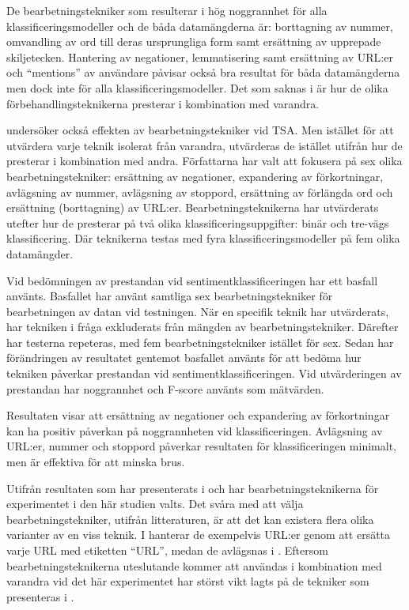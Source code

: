 \documentclass{kaumasters} %
\begin{document}
De bearbetningstekniker som resulterar i hög noggrannhet för alla klassificeringsmodeller och de båda datamängderna är: borttagning av nummer, omvandling av ord till deras ursprungliga form samt ersättning av upprepade skiljetecken. Hantering av negationer, lemmatisering samt ersättning av URL:er och “mentions” av användare påvisar också bra resultat för båda datamängderna men dock inte för alla klassificeringsmodeller. Det som saknas i \cite{effrosynidis2017comparison} är hur de olika förbehandlingsteknikerna presterar i kombination med varandra. 

\cite{7862202} undersöker också effekten av bearbetningstekniker vid TSA. Men istället för att utvärdera varje teknik isolerat från varandra, utvärderas de istället utifrån hur de presterar i kombination med andra. Författarna har valt att fokusera på sex olika bearbetningstekniker: ersättning av negationer, expandering av förkortningar, avlägsning av nummer, avlägsning av stoppord, ersättning av förlängda ord och ersättning (borttagning) av URL:er. Bearbetningsteknikerna har utvärderats utefter hur de presterar på två olika klassificeringsuppgifter: binär och tre-vägs klassificering. Där teknikerna testas med fyra klassificeringsmodeller på fem olika datamängder. 

Vid bedömningen av prestandan vid sentimentklassificeringen har ett basfall använts. Basfallet har använt samtliga sex bearbetningstekniker för bearbetningen av datan vid testningen. När en specifik teknik har utvärderats, har tekniken i fråga exkluderats från mängden av bearbetningstekniker. Därefter har testerna repeteras, med fem bearbetningstekniker istället för sex. Sedan har förändringen av resultatet gentemot basfallet använts för att bedöma hur tekniken påverkar prestandan vid sentimentklassificeringen. Vid utvärderingen av prestandan har noggrannhet och F-score använts som mätvärden. 

Resultaten visar att ersättning av negationer och expandering av förkortningar kan ha positiv påverkan på noggrannheten vid klassificeringen. Avlägsning av URL:er, nummer och stoppord påverkar resultaten för klassificeringen minimalt, men är effektiva för att minska brus. 

Utifrån resultaten som har presenterats i \cite{effrosynidis2017comparison} och \cite{7862202} har bearbetningsteknikerna för experimentet i den här studien valts. 
Det svåra med att välja bearbetningstekniker, utifrån litteraturen, är att det kan existera flera olika varianter av en viss teknik. I \cite{effrosynidis2017comparison} hanterar de exempelvis URL:er genom att ersätta varje URL med etiketten “URL”, medan de avlägsnas i \cite{7862202}. Eftersom bearbetningsteknikerna uteslutande kommer att användas i kombination med varandra vid det här experimentet har störst vikt lagts på de tekniker som presenteras i \cite{7862202}.
\end{document}
